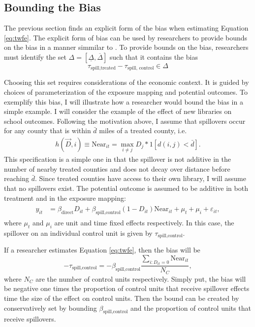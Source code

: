 \documentclass[11pt]{article}
\begin{document}
\subsection{Bounding the Bias}

The previous section finds an explicit form of the bias when estimating Equation \ref{eq:twfe}. The explicit form of bias can be used by researchers to provide bounds on the bias in a manner simmilar to \citet{Rambachan_Roth_2020}. To provide bounds on the bias, researchers must identify the set $\Delta = [\underline{\Delta}, \overline{\Delta}]$ such that it contains the bias \[ 
    \tau_{\text{spill,treated}} - \tau_{\text{spill, control}} \in \Delta
\]

Choosing this set requires considerations of the economic context. It is guided by choices of parameterization of the exposure mapping and potential outcomes. To exemplify this bias, I will illustrate how a researcher would bound the bias in a simple example. I will consider the example of the effect of new libraries on school outcomes. Following the motivation above, I assume that spillovers occur for any county that is within $\bar{d}$ miles of a treated county, i.e. 
\begin{align}
    \label{eq:example_exposure}
    h(\vec{D}, i) \equiv \text{Near}_{it} = \max_{i \neq j} D_j * 1[ d(i,j) < \bar{d} ].
\end{align}
This specification is a simple one in that the spillover is not additive in the number of nearby treated counties and does not decay over distance before reaching $\bar{d}$. Since treated counties have access to their own library, I will assume that no spillovers exist. The potential outcome is assumed to be additive in both treatment and in the exposure mapping:
\begin{align}
    \label{eq:example_po}
    \begin{split}
        y_{it} &= \beta_{\text{direct}} D_{it} + \beta_{\text{spill,control}} (1-D_{it}) \text{Near}_{it} + \mu_t + \mu_i + \varepsilon_{it},
    \end{split}
\end{align}
where $\mu_t$ and $\mu_i$ are unit and time fixed effects respectively. In this case, the spillover on an individual control unit is given by $\tau_{\text{spill,control}}$. 

If a researcher estimates Equation \ref{eq:twfe}, then the bias will be \[ 
    - \tau_{\text{spill,control}} = - \beta_{\text{spill,control}} \frac{\sum_{i: D_{it} = 0} \text{Near}_{it}}{N_C},
\] 
where $N_C$ are the number of control units respectively. Simply put, the bias will be negative one times the proportion of control units that receive spillover effects time the size of the effect on control units. Then the bound can be created by conservatively set by bounding $\beta_{\text{spill,control}}$ and the proportion of control units that receive spillovers.
\end{document}
